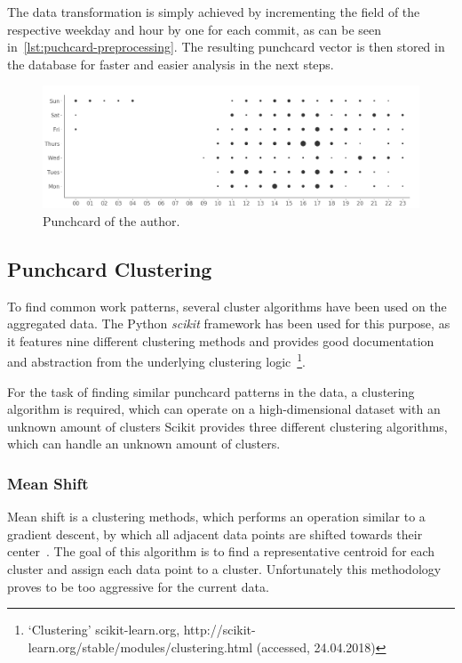 The data transformation is simply achieved by incrementing the field of the respective weekday and hour by one for each commit, as can be seen in~\ref{lst:puchcard-preprocessing}.
The resulting punchcard vector is then stored in the database for faster and easier analysis in the next steps.

\begin{figure}[H]
    \includegraphics[scale=0.32]{./graphs/analysis/ordered-punchcard}
    \centering
    \caption{Punchcard of the author.}\label{fig:working-hour-rhythm-author}
\end{figure}


\subsection{Punchcard Clustering}

To find common work patterns, several cluster algorithms have been used on the aggregated data.
The Python \emph{scikit} framework has been used for this purpose, as it features nine different clustering methods and provides good documentation and abstraction from the underlying clustering logic~\footnote{`Clustering' scikit-learn.org, http://scikit-learn.org/stable/modules/clustering.html (accessed, 24.04.2018)}.

For the task of finding similar punchcard patterns in the data, a clustering algorithm is required, which can operate on a high-dimensional dataset with an unknown amount of clusters
Scikit provides three different clustering algorithms, which can handle an unknown amount of clusters.

\subsubsection{Mean Shift}\label{mean-shift}
Mean shift is a clustering methods, which performs an operation similar to a gradient descent, by which all adjacent data points are shifted towards their center~\cite{article:mean-shift}.
The goal of this algorithm is to find a representative centroid for each cluster and assign each data point to a cluster.
Unfortunately this methodology proves to be too aggressive for the current data.

